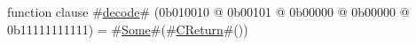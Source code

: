 function clause #\hyperref[zdecode]{decode}# (0b010010 @ 0b00101 @    0b00000 @    0b00000 @ 0b11111111111) = #\hyperref[zSome]{Some}#(#\hyperref[zCReturn]{CReturn}#())
